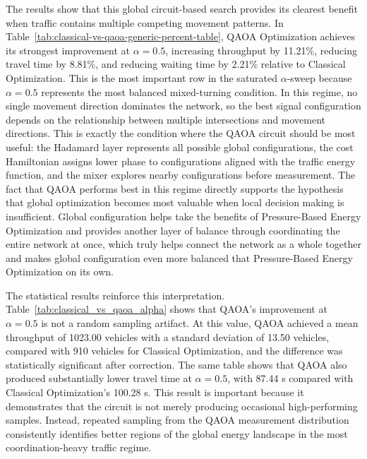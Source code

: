 \documentclass[12pt]{article}
\begin{document}
The results show that this global circuit-based search provides its clearest benefit when traffic contains multiple competing movement patterns. In Table~\ref{tab:classical-vs-qaoa-generic-percent-table}, QAOA Optimization achieves its strongest improvement at $\alpha=0.5$, increasing throughput by 11.21\%, reducing travel time by 8.81\%, and reducing waiting time by 2.21\% relative to Classical Optimization. This is the most important row in the saturated $\alpha$-sweep because $\alpha=0.5$ represents the most balanced mixed-turning condition. In this regime, no single movement direction dominates the network, so the best signal configuration depends on the relationship between multiple intersections and movement directions. This is exactly the condition where the QAOA circuit should be most useful: the Hadamard layer represents all possible global configurations, the cost Hamiltonian assigns lower phase to configurations aligned with the traffic energy function, and the mixer explores nearby configurations before measurement. The fact that QAOA performs best in this regime directly supports the hypothesis that global optimization becomes most valuable when local decision making is insufficient. Global configuration helps take the benefits of Pressure-Based Energy Optimization and provides another layer of balance through coordinating the entire network at once, which truly helps connect the network as a whole together and makes global configuration even more balanced that Pressure-Based Energy Optimization on its own.

The statistical results reinforce this interpretation. Table~\ref{tab:classical_vs_qaoa_alpha} shows that QAOA's improvement at $\alpha=0.5$ is not a random sampling artifact. At this value, QAOA achieved a mean throughput of 1023.00 vehicles with a standard deviation of 13.50 vehicles, compared with 910 vehicles for Classical Optimization, and the difference was statistically significant after correction. The same table shows that QAOA also produced substantially lower travel time at $\alpha=0.5$, with 87.44 s compared with Classical Optimization's 100.28 s. This result is important because it demonstrates that the circuit is not merely producing occasional high-performing samples. Instead, repeated sampling from the QAOA measurement distribution consistently identifies better regions of the global energy landscape in the most coordination-heavy traffic regime.
\end{document}
